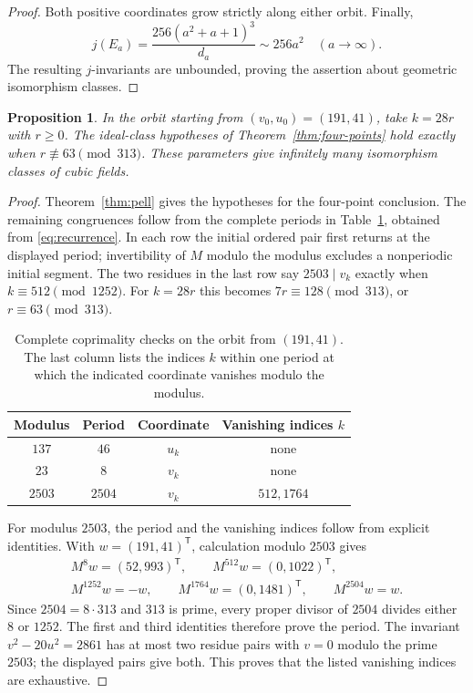 \documentclass[11pt,leqno,oneside,letterpaper]{amsart}
\newtheorem{proposition}[theorem]{Proposition}
\theoremstyle{remark}
\numberwithin{equation}{section}
\begin{document}
\begin{proof}
  Both positive coordinates grow strictly along either orbit. Finally,
  \[
    j(E_a)=\frac{256(a^2+a+1)^3}{d_a}\sim256a^2
    \quad(a\longrightarrow\infty).
  \]
  The resulting $j$-invariants are unbounded, proving the assertion about geometric isomorphism classes.
\end{proof}

\begin{proposition}\label{prop:subsequence}
  In the orbit starting from $(v_0,u_0)=(191,41)$, take $k=28r$ with $r\geq0$. The ideal-class hypotheses of Theorem~\ref{thm:four-points} hold exactly when $r\not\equiv63\pmod{313}$. These parameters give infinitely many isomorphism classes of cubic fields.
\end{proposition}

\begin{proof}
  Theorem~\ref{thm:pell} gives the hypotheses for the four-point conclusion. The remaining congruences follow from the complete periods in Table~\ref{tab:coprime}, obtained from \eqref{eq:recurrence}. In each row the initial ordered pair first returns at the displayed period; invertibility of $M$ modulo the modulus excludes a nonperiodic initial segment. The two residues in the last row say $2503\mid v_k$ exactly when $k\equiv512\pmod{1252}$. For $k=28r$ this becomes $7r\equiv128\pmod{313}$, or $r\equiv63\pmod{313}$.

  \begin{table}[ht]
    \centering

    \begin{tabular}{cccc}
      \toprule
      Modulus & Period & Coordinate & Vanishing indices $k$ \\
      \midrule
      $137$   & $46$   & $u_k$      & none                  \\
      $23$    & $8$    & $v_k$      & none                  \\
      $2503$  & $2504$ & $v_k$      & $512,1764$            \\
      \bottomrule
    \end{tabular}
    \caption{Complete coprimality checks on the orbit from $(191,41)$. The last column lists the indices $k$ within one period at which the indicated coordinate vanishes modulo the modulus.}
    \label{tab:coprime}
  \end{table}

  For modulus $2503$, the period and the vanishing indices follow from explicit identities. With $w=(191,41)^{\mathsf T}$, calculation modulo $2503$ gives
  \begin{gather*}
    M^8w=(52,993)^{\mathsf T},\qquad M^{512}w=(0,1022)^{\mathsf T},\\
    M^{1252}w=-w,\qquad M^{1764}w=(0,1481)^{\mathsf T},\qquad M^{2504}w=w.
  \end{gather*}
  Since $2504=8\cdot313$ and $313$ is prime, every proper divisor of $2504$ divides either $8$ or $1252$. The first and third identities therefore prove the period. The invariant $v^2-20u^2=2861$ has at most two residue pairs with $v=0$ modulo the prime $2503$; the displayed pairs give both. This proves that the listed vanishing indices are exhaustive.


\end{proof}
\end{document}
